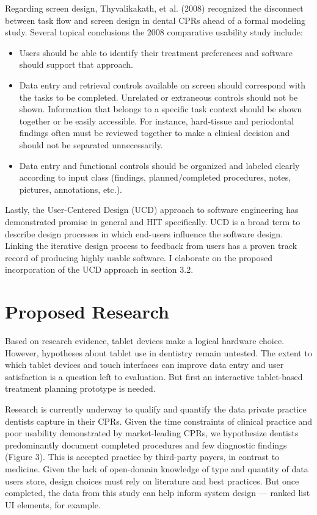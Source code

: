\documentclass[11pt]{article}
\begin{document}
Regarding screen design, Thyvalikakath, et al. (2008) recognized the disconnect between task flow and screen design in dental CPRs ahead of a formal modeling study. Several topical conclusions the 2008 comparative usability study include: \begin{itemize}
\item Users should be able to identify their treatment preferences and software should support that approach.
\item Data entry and retrieval controls available on screen should correspond with the tasks to be completed. Unrelated or extraneous controls should not be shown. Information that belongs to a specific task context should be shown together or be easily accessible. For instance, hard-tissue and periodontal findings often must be reviewed together to make a clinical decision and should not be separated unnecessarily.
\item Data entry and functional controls should be organized and labeled clearly according to input class (findings, planned/completed procedures, notes, pictures, annotations, etc.).
\end{itemize}

Lastly, the User-Centered Design (UCD) approach to software engineering has demonstrated promise in general\cite{Bannon1986Issues-in-desig,Wixon1997The-usability-e,Gould1997How-to-design-u,Abras2004Encycolopeida-o} and HIT specifically\cite{Johnson2005A-user-centered}. UCD is a broad term to describe design processes in which end-users influence the software design. Linking the iterative design process to feedback from users has a proven track record of producing highly usable software. I elaborate on the proposed incorporation of the UCD approach in section 3.2.

\section{Proposed Research}
Based on research evidence, tablet devices make a logical hardware choice. However, hypotheses about tablet use in dentistry remain untested. The extent to which tablet devices and touch interfaces can improve data entry and user satisfaction is a question left to evaluation. But first an interactive tablet-based treatment planning prototype is needed.

Research is currently underway to qualify and quantify the data private practice dentists capture in their CPRs. Given the time constraints of clinical practice and poor usability demonstrated by market-leading CPRs, we hypothesize dentists predominantly document completed procedures and few diagnostic findings (Figure 3). This is accepted practice by third-party payers, in contrast to medicine. Given the lack of open-domain knowledge of type and quantity of data users store, design choices must rely on literature and best practices. But once completed, the data from this study can help inform system design --- ranked list UI elements, for example.
\end{document}
